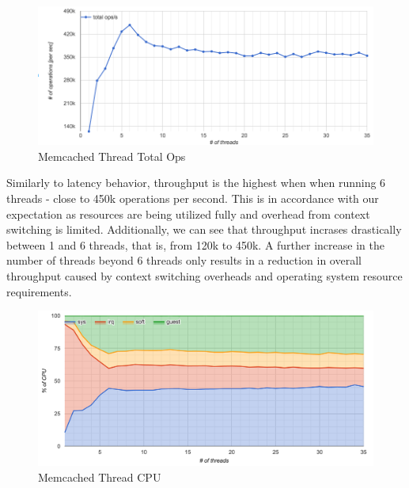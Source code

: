 \begin{figure}[h]
    \includegraphics[width=\textwidth]{./res/5_threads_total_ops.png}
    \caption{Memcached Thread Total Ops}
    \label{fig:memcached-threads-total-ops}
\end{figure}

Similarly to latency behavior, throughput is the highest when when running 6 threads - close to 450k operations per second. This is in accordance with our expectation as resources are being utilized fully and overhead from context switching is limited. Additionally, we can see that throughput incrases drastically between 1 and 6 threads, that is, from 120k to 450k. A further increase in the number of threads beyond 6 threads only results in a reduction in overall throughput caused by context switching overheads and operating system resource requirements.

\begin{figure}[h]
    \includegraphics[width=\textwidth]{./res/5_threads_cpu.png}
    \caption{Memcached Thread CPU}
    \label{fig:memcached-threads-cpu}
\end{figure}

